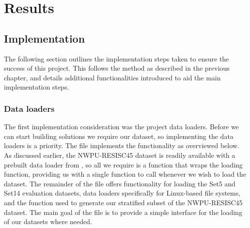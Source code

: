 \chapter{Results}
\label{chapter3}

\section{Implementation}
The following section outlines the implementation steps taken to ensure the success of this project. This follows the method as described in the previous chapter, and details additional functionalities introduced to aid the main implementation steps.

\subsection{Data loaders}
The first implementation consideration was the project data loaders. Before we can start building solutions we require our dataset, so implementing the data loaders is a priority. The  file implements the functionality as overviewed below. As discussed earlier, the NWPU-RESISC45 dataset is readily available with a prebuilt data loader from , so all we require is a function that wraps the  loading function, providing us with a single function to call whenever we wish to load the dataset. The remainder of the  file offers functionality for loading the Set5 and Set14 evaluation datasets, data loaders specifically for Linux-based file systems, and the function used to generate our stratified subset of the NWPU-RESISC45 dataset. The main goal of the  file is to provide a simple interface for the loading of our datasets where needed.

